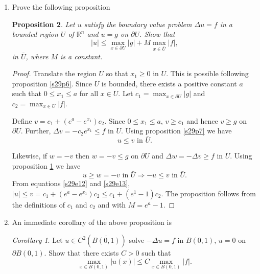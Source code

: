 \documentclass{article}
\theoremstyle{plain}
\numberwithin{thm}{section}
\theoremstyle{plain}
\newtheorem{prop}{Proposition}
\numberwithin{prop}{section}
\theoremstyle{definition}
\numberwithin{defn}{section}
\theoremstyle{remark}
\newtheorem*{cor}{Corollary}
\numberwithin{equation}{section}
\begin{document}
\begin{enumerate}
\begin{prop}\label{s29p8}
Let $u$ solve the problem $L(u) = f$ in a bounded region $U$ and $u = g$ on $\partial U$, where $L$ is the operator
defined in equation \eqref{s29e11}. If $w$ satisfies $L(w) \ge f$ in $U$ and $w \le g$ on $\partial U$ then show
that $u \ge w$ in $U$.
\end{prop}
\begin{proof}
$L(w - u) = L(w) - L(u) = L(w) - f \ge 0$. Thus $w - u$ is sub-harmonic. On the boundary $w - u = w - g \le 0$. 
Therefore, by proposition \ref{s29p1}, $w - u \le 0$ in $U$.
\end{proof}

\item Prove the following proposition
\begin{prop}\label{s29p9}
Let $u$ satisfy the boundary value problem $\Delta u = f$ in a bounded region $U$ of $\mathbb{R}^n$ and $u = g$ on 
$\partial U$. Show that
\[
|u| \le \max_{x \in \partial U}|g| + M \max_{x \in \bar{U}}|f|,
\]
in $\bar{U}$, where $M$ is a constant.
\end{prop}
\begin{proof}
Translate the region $U$ so that $x_1 \ge 0$ in $U$. This is possible following proposition \ref{s29p6}. Since
$U$ is bounded, there exists a positive constant $a$ such that $0 \le x_1 \le a$ for all $x \in U$. Let $c_1 = 
\max_{x \in \partial U}|g|$ and $c_2 = \max_{x \in U}|f|$. 

Define $v = c_1 + (e^a - e^{x_1})c_2$. Since $0 \le x_1 \le a$, $v \ge c_1$ and hence $v \ge g$ on $\partial U$. 
Further, $\Delta v = -c_2e^{x_1} \le f$ in $U$. Using proposition \ref{s29p7} we have 
\begin{equation}\label{s29e12}
u \le v \text{ in } \bar{U}.
\end{equation}

Likewise, if $w = -v$ then $w = -v \le g$ on $\partial U$ and $\Delta w = -\Delta v \ge f$ in $U$. Using 
proposition \ref{s29p8} we have
\begin{equation}\label{s29e13}
u \ge w = -v \text{ in } \bar{U} \Rightarrow -u \le v \text{ in } \bar{U}.
\end{equation}
From equations \eqref{s29e12} and \eqref{s29e13}, $|u| \le v = c_1 + (e^a - e^{x_1})c_2 \le c_1 + (e^1 - 1)c_2$.
The proposition follows from the definitions of $c_1$ and $c_2$ and with $M = e^a - 1$.
\end{proof}

\item An immediate corollary of the above proposition is
\begin{cor}
Let $u \in C^2(\overline{B(0, 1)})$ solve $-\Delta u = f$ in $B(0, 1)$, $u = 0$ on $\partial B(0,1)$. Show 
that there exists $C > 0$ such that 
\[
\max_{x \in B(0,1)} |u(x)| \le C \max_{x \in B(0,1)}|f|.
\]
\end{cor}


\end{enumerate}
\end{document}
